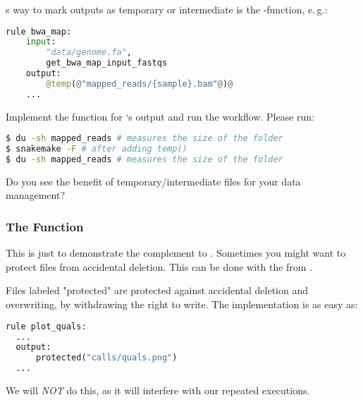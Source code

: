 \begin{frame}[fragile]
  \frametitle{}
  \Snakemake{}s way to mark outputs as temporary or intermediate is the -function, e.\,g.:
  \begin{lstlisting}[language=Python,style=Python]
rule bwa_map:
    input:
        "data/genome.fa",
        get_bwa_map_input_fastqs
    output:
        @temp(@"mapped_reads/{sample}.bam"@)@
    ...
  \end{lstlisting}
  \pause
  Implement the  function for `s output and run the workflow. Please run:
  \begin{lstlisting}[language=Bash, style=Shell]
$ du -sh mapped_reads # measures the size of the folder
$ snakemake -F # after adding temp()
$ du -sh mapped_reads # measures the size of the folder
  \end{lstlisting}
  \pause
  \bcquestion Do you see the benefit of temporary/intermediate files for your data management?
\end{frame}

\begin{frame}[fragile]
  \frametitle{The  Function}
  \begin{hint}
  	This is just to demonstrate the complement to . Sometimes you might want to protect files from accidental deletion. This can be done with the  from \Snakemake.
  \end{hint}
  \pause
  Files labeled "protected" are protected against accidental deletion and overwriting, by withdrawing the right to write. The implementation is as easy as:
  \begin{lstlisting}[language=Python,style=Python]
rule plot_quals:
  ...
  output: 
      protected("calls/quals.png")
  ...
  \end{lstlisting}
  \pause
  \begin{hint}
  	We will \emph{NOT} do this, as it will interfere with our repeated executions.
  \end{hint}	
\end{frame} 

